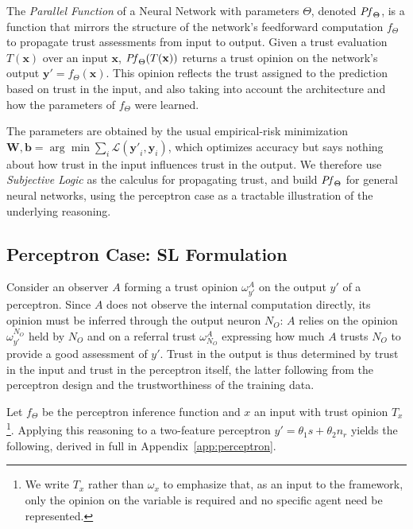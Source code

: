 \begin{definition}
The \emph{Parallel Function} of a Neural Network with parameters \(\Theta\), denoted \( \mathit{Pf}_\Theta \), is a function that mirrors the structure of the network’s feedforward computation \( f_\Theta \) to propagate trust assessments from input to output. Given a trust evaluation \( T(\mathbf{x}) \) over an input \(\mathbf{x}\), \( \mathit{Pf}_\Theta(T(\mathbf{x})) \) returns a trust opinion on the network’s output \(\mathbf{y\prime} = f_\Theta(\mathbf{x})\). This opinion reflects the trust assigned to the prediction based on trust in the input, and also taking into account the architecture and how the parameters of \( f_\Theta \) were learned.
\end{definition}

The parameters are obtained by the usual empirical-risk minimization \(\mathbf{W},\mathbf{b} = \arg\min \sum_i \mathcal{L}(\mathbf{y\prime}_i,\mathbf{y}_i)\), which optimizes accuracy but says nothing about how trust in the input influences trust in the output. We therefore use \emph{Subjective Logic} as the calculus for propagating trust, and build \(\mathit{Pf}_\Theta\) for general neural networks, using the perceptron case as a tractable illustration of the underlying reasoning.
 
\vspace{-0.5em}
\subsection{Perceptron Case: SL Formulation}\label{sec:perceptron}

Consider an observer \(A\) forming a trust opinion \(\omega_{y\prime}^A\) on the output \(y\prime\) of a perceptron. Since \(A\) does not observe the internal computation directly, its opinion must be inferred through the output neuron \(N_O\): \(A\) relies on the opinion \(\omega_{y\prime}^{N_O}\) held by \(N_O\) and on a referral trust \(\omega_{N_O}^A\) expressing how much \(A\) trusts \(N_O\) to provide a good assessment of \(y\prime\). Trust in the output is thus determined by trust in the input and trust in the perceptron itself, the latter following from the perceptron design and the trustworthiness of the training data.

Let \( f_\Theta \) be the perceptron inference function and \( x \) an input with trust opinion \( T_x \)\footnote{We write \(T_x\) rather than \(\omega_x\) to emphasize that, as an input to the framework, only the opinion on the variable is required and no specific agent need be represented.}. Applying this reasoning to a two-feature perceptron \(y\prime = \theta_1 s + \theta_2 n_r\) yields the following, derived in full in Appendix~\ref{app:perceptron}.

